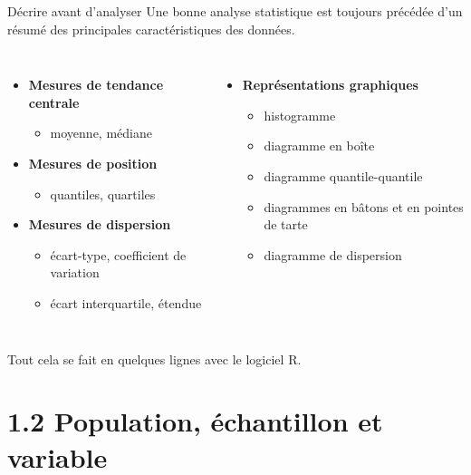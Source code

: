 \documentclass{BeamerTemplate}
\begin{document}
\begin{frame}[t]{Décrire avant d'analyser}
  Une bonne analyse statistique est \alert{toujours} précédée d'un résumé des
  principales caractéristiques des données.

  \begin{columns}[T]
    \begin{itemize}\itemsep 2mm
      \item \textbf{Mesures de tendance centrale}
        \begin{itemize}
          \item moyenne, médiane
        \end{itemize}
      \item \textbf{Mesures de position}
        \begin{itemize}
          \item quantiles, quartiles
        \end{itemize}
      \item \textbf{Mesures de dispersion}
        \begin{itemize}
          \item écart-type, coefficient de variation
          \item écart interquartile, étendue
        \end{itemize}
    \end{itemize}
    \begin{itemize}\itemsep 2mm
      \item \textbf{Représentations graphiques}
        \begin{itemize}
          \item histogramme
          \item diagramme en boîte
          \item diagramme quantile-quantile
          \item diagrammes en bâtons et en pointes de tarte
          \item diagramme de dispersion
        \end{itemize}
    \end{itemize}
  \end{columns}

  \medskip
  Tout cela se fait en quelques lignes avec le logiciel \alert{R}.
\end{frame}

\section[Population et variables]{1.2 Population, échantillon et variable}
\end{document}
